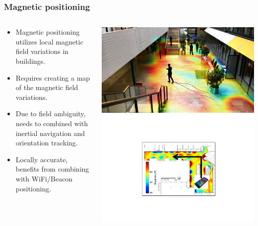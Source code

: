 \documentclass[xcolor=svgnames,english,handout]{beamer}
\begin{document}
\begin{frame}
  \frametitle{Magnetic positioning}

  \begin{columns}
  \begin{column}{0.6\textwidth}
  \begin{itemize}[<+->]       
  \item \alert{Magnetic positioning} utilizes \alert{local magnetic field variations} in buildings.
  \item Requires creating a \alert{map of the magnetic field variations}.
  \item Due to field ambiguity, needs to combined with \alert{inertial navigation} and \alert{orientation tracking}.
  \item \alert{Locally accurate}, benefits from \alert{combining with WiFi/Beacon positioning}.
  \end{itemize}
  \end{column}
  \begin{column}{0.4\textwidth}
  \includegraphics[width=\columnwidth]{terrain-matching} \\
  \vspace{2em}
  \includegraphics[width=\columnwidth]{magnetic}
  \end{column}
  \end{columns}
\end{frame}
\end{document}
